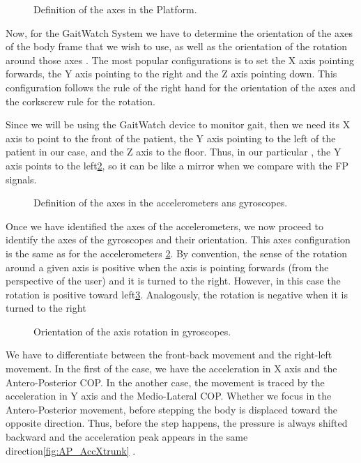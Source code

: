 \begin{figure}[H]
	\centering
	\caption{Definition of the axes in the Platform.}
	\label{fig:axesFP}
\end{figure}

Now, for the GaitWatch System we have to determine the orientation of the axes of the body frame that we wish to use, as well as the orientation of the rotation around those axes . The most popular configurations is to set the X axis pointing forwards, the Y axis pointing to the right and the Z axis pointing down. This configuration follows the rule of the right hand for the orientation of the axes and the corkscrew rule for the rotation. \cite{OlivaresBotzel2013}

Since we will be using the GaitWatch device to monitor gait, then we need its X axis to point to the front of the patient, the Y axis pointing to the left  of the patient in our case, and the Z axis to the floor. Thus, in our particular , the Y axis points to the left\ref{fig:axesGW}, so it can be like a mirror when we compare with the FP signals.\cite{OlivaresBotzel2013}

\begin{figure}[H]
	\centering
	\caption{Definition of the axes in the accelerometers ans gyroscopes.}
	\label{fig:axesGW}
\end{figure}

Once we have identified the axes of the accelerometers, we now proceed to identify the axes of the gyroscopes and their orientation. This axes configuration is the same as for the accelerometers \ref{fig:axesGW}. By convention, the sense of the rotation around a given axis is positive when the axis is pointing forwards (from the perspective of the user) and it is turned to the right. However, in this case the rotation is positive toward left\ref{fig:axesGWGyro}. Analogously, the rotation is negative when it is turned to the right \cite{OlivaresBotzel2013}

\begin{figure}[H]
	\centering
	\caption{Orientation of the axis rotation in gyroscopes.}
	\label{fig:axesGWGyro}
\end{figure}


We have to differentiate between the front-back movement and the right-left movement. In the first of the case, we have the acceleration in X axis and the Antero-Posterior COP. In the another case, the movement is traced by the acceleration in Y axis and the Medio-Lateral  COP.
Whether we focus in the Antero-Posterior movement, before stepping the body is displaced toward the opposite direction. Thus, before the step happens, the pressure is always shifted backward and the acceleration peak appears in the same direction\ref{fig:AP_AccXtrunk} .

